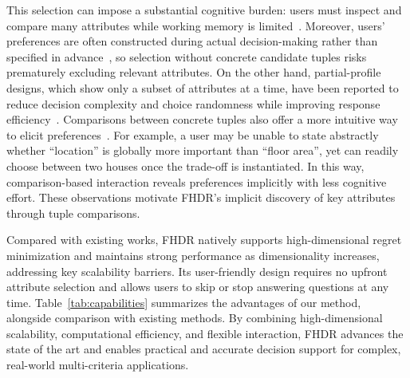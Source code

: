 This selection can impose a substantial cognitive burden: users must inspect and compare many attributes while working memory is limited~\cite{Cowan_2001}. Moreover, users’ preferences are often constructed during actual decision-making rather than specified in advance~\cite{Slovic1995}, so selection without concrete candidate tuples risks prematurely excluding relevant attributes. On the other hand, partial-profile designs, which show only a subset of attributes at a time, have been reported to reduce decision complexity and choice randomness while improving response efficiency~\cite{meyerhoff_performance_2023}. Comparisons between concrete tuples also offer a more intuitive way to elicit preferences~\cite{NL12, XCL19, WWX21, CW23}. For example, a user may be unable to state abstractly whether ``location'' is globally more important than ``floor area'', yet can readily choose between two houses once the trade-off is instantiated. In this way, comparison-based interaction reveals preferences implicitly with less cognitive effort. These observations motivate FHDR’s implicit discovery of key attributes through tuple comparisons.

Compared with existing works, FHDR natively supports high-dimensional regret minimization and maintains strong performance as dimensionality increases, addressing key scalability barriers. Its user-friendly design requires no upfront attribute selection and allows users to skip or stop answering questions at any time. Table~\ref{tab:capabilities} summarizes the advantages of our method, alongside comparison with existing methods. By combining high-dimensional scalability, computational efficiency, and flexible interaction, FHDR advances the state of the art and enables practical and accurate decision support for complex, real-world multi-criteria applications.

